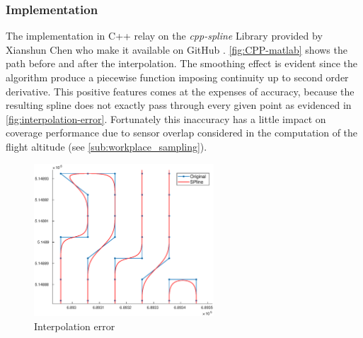 \subsubsection{Implementation} %
\label{ssub:implementation}
The implementation in C++ relay on the \textit{cpp-spline} Library provided by Xianshun Chen who make it available on GitHub \cite{cpp-spline}. \autoref{fig:CPP-matlab} shows the path before and after the interpolation. The smoothing effect is evident since the algorithm produce a piecewise function imposing continuity up to second order derivative. This positive features comes at the expenses of accuracy, because the resulting spline does not exactly pass through every given point as evidenced in \autoref{fig:interpolation-error}. Fortunately this inaccuracy has a little impact on coverage performance due to sensor overlap considered in the computation of the flight altitude (see \autoref{sub:workplace_sampling}).
\begin{figure}[ht]
    \centering
    \includegraphics[width=0.6\textwidth]{figures/C3/Interpolation-error.eps}
    \caption{Interpolation error}
    \label{fig:interpolation-error}
\end{figure}








